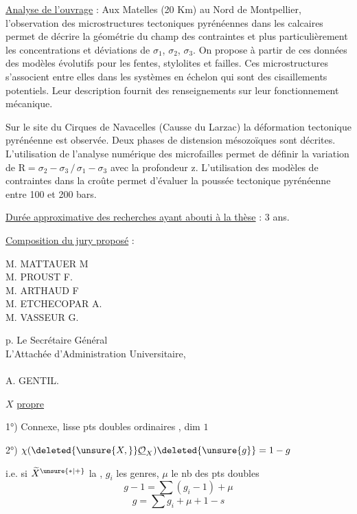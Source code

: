 \uline{Analyse de l'ouvrage} : Aux Matelles (20 Km) au Nord de Montpellier, l'observation des microstructures tectoniques pyrénéennes dans les calcaires permet de décrire la géométrie du champ des contraintes et plus particulièrement les concentrations et déviations de $\sigma_1$, $\sigma_2$, $\sigma_3$. On propose à partir de ces données des modèles évolutifs pour les fentes, stylolites et failles. Ces microstructures s'associent entre elles dans les systèmes en échelon qui sont des cisaillements potentiels. Leur description fournit des renseignements sur leur fonctionnement mécanique.

Sur le site du Cirques de Navacelles (Causse du Larzac) la déformation tectonique pyrénéenne est observée. Deux phases de distension mésozoïques sont décrites. L'utilisation de l'analyse numérique des microfailles permet de définir la variation de $\mathrm R=\sigma_2-\sigma_3\,/\,\sigma_1-\sigma_3$ avec la profondeur z. L'utilisation des modèles de contraintes dans la croûte permet d'évaluer la poussée tectonique pyrénéenne entre 100 et 200 bars.

\uline{Durée approximative des recherches ayant abouti à la thèse} : 3 ans.

\uline{Composition du jury proposé} :

\begin{flushleft}
M. MATTAUER M\\
M. PROUST F.\\
M. ARTHAUD F\\
M. ETCHECOPAR A.\\
M. VASSEUR G.
\end{flushleft}

\begin{flushright}
p. Le Secrétaire Général\\
L'Attachée d'Administration Universitaire,\\
\uline{}\\
A. GENTIL.
\end{flushright}



$X$ \uline{propre}

1°) Connexe, lisse  pts doubles ordinaires
, dim $1$

2°) $\chi(\deleted{\unsure{X,}}\underline{\mathcal O}_X)\deleted{\unsure{g}}=1-g$

i.e. si $\widetilde X^{\unsure{*|+}}$ la , $g_i$ les genres,
$\mu$ le nb des pts doubles
\[
g-1=\sum(g_i-1)+\mu
\]
\[
g=\sum g_i+\mu+1-s
\]

